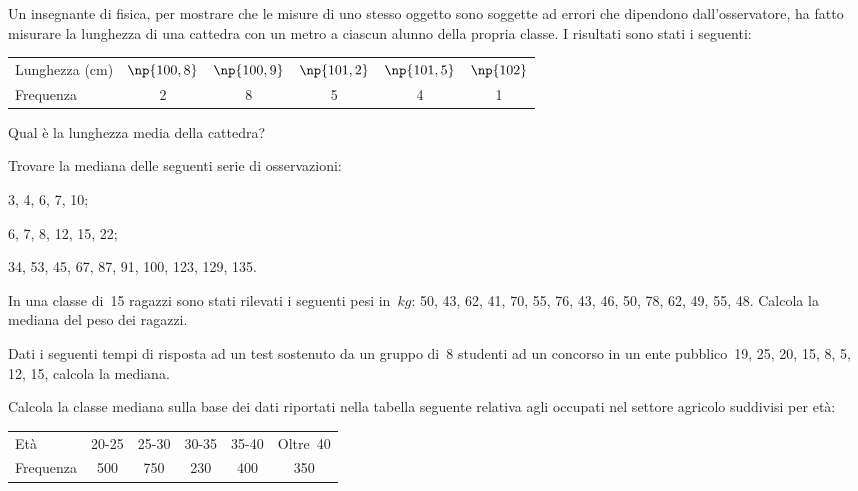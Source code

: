 \begin{esercizio}
\label{ese:A.29}
Un insegnante di fisica, per mostrare che le misure di uno stesso oggetto sono soggette ad errori che dipendono dall'osservatore,
ha fatto misurare la lunghezza di una cattedra con un metro a ciascun alunno della propria classe. I risultati sono stati i seguenti:
\begin{center}
 \begin{tabular}{l*{5}{c}}
\toprule
Lunghezza (cm) & $\np{100,8}$ & $\np{100,9}$ & $\np{101,2}$ & $\np{101,5}$ & $\np{102}$\\
Frequenza & 2 & 8 & 5 & 4 & 1\\
\bottomrule
\end{tabular}
\end{center}
Qual è la lunghezza media della cattedra?
\end{esercizio}

\begin{esercizio}[\Ast]
\label{ese:A.30}
Trovare la mediana delle seguenti serie di osservazioni:
\begin{multicols}{2}
\begin{enumeratea}
 \item 3, 4, 6, 7, 10;
 \item 6, 7, 8, 12, 15, 22;
 \item 34, 53, 45, 67, 87, 91, 100, 123, 129, 135.
\end{enumeratea}
\end{multicols}
\end{esercizio}

\begin{esercizio}[\Ast]
\label{ese:A.31}
In una classe di~15 ragazzi sono stati rilevati i seguenti pesi in~$\unit{kg}$:
50, 43, 62, 41, 70, 55, 76, 43, 46, 50, 78, 62, 49, 55, 48.
Calcola la mediana del peso dei ragazzi.
\end{esercizio}

\begin{esercizio}[\Ast]
\label{ese:A.32}
Dati i seguenti tempi di risposta ad un test sostenuto da un gruppo di~8 studenti ad un concorso
in un ente pubblico~19, 25, 20, 15, 8, 5, 12, 15, calcola la mediana.
\end{esercizio}

\begin{esercizio}
\label{ese:A.33}
Calcola la classe mediana sulla base dei dati riportati nella tabella seguente relativa agli occupati nel settore agricolo suddivisi per età:
\begin{center}
 \begin{tabular}{l*{5}{c}}
\toprule
Età & 20-25 & 25-30 & 30-35 & 35-40 & Oltre~40\\
Frequenza & 500 & 750 & 230 & 400 & 350\\
\bottomrule
\end{tabular}
\end{center}
\end{esercizio}

